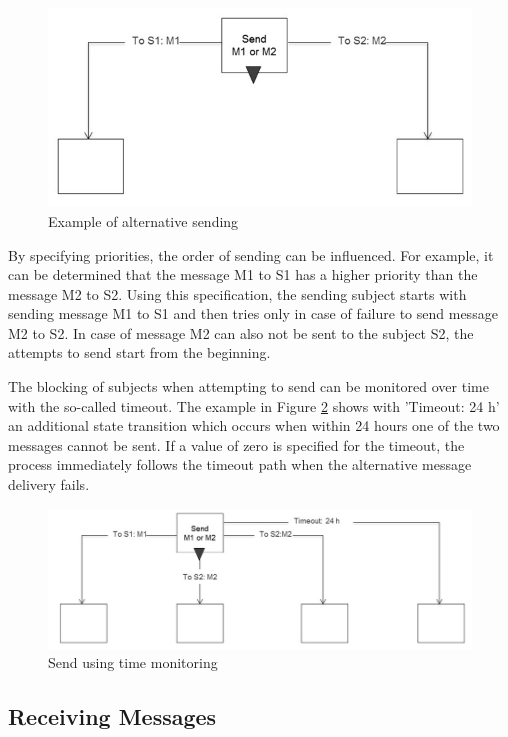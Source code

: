 \begin{figure}[htbp]
	\centering
	\includegraphics[width=0.7\linewidth]{Figures/Ontology/SubjectExecution/sendState}
	\caption[Example of alternative sending]{Example of alternative sending}
	\label{fig:sendstate}
\end{figure}

By specifying priorities, the order of sending can be influenced. For example, it can be determined that the message M1 to S1 has a higher priority than the message M2 to S2. Using this specification, the sending subject starts with sending message M1 to S1 and then tries only in case of failure to send message M2 to S2. In case of message M2 can also not be sent to the subject S2, the attempts to send start from the beginning.

The blocking of subjects when attempting to send can be monitored over time with the so-called timeout. The example in Figure \ref{fig:sendstatetimer} shows with 'Timeout: 24 h' an additional state transition which occurs when within 24 hours one of the two messages cannot be sent. If a value of zero is specified for the timeout, the process immediately follows the timeout path when the alternative message delivery fails.

\begin{figure}[htbp]
	\centering
	\includegraphics[width=0.7\linewidth]{Figures/Ontology/SubjectExecution/SendSTateTimer}
	\caption[Send using time monitoring]{Send using time monitoring}
	\label{fig:sendstatetimer}
\end{figure}

\subsection{Receiving Messages}

